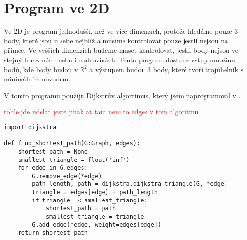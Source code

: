 \section{Program ve 2D}
\label{sec:program_2D}

Ve 2D je program jednodušší, než ve více dimenzích, protože hledáme pouze 3 body, které jsou u sebe nejblíž a musíme kontrolovat pouze jestli nejsou na přímce. Ve vyšších dimenzích budeme muset kontrolovat, jestli body nejsou ve stejných rovinách nebo i nadrovinách. Tento program dostane vstup množinu bodů, kde body budou v $\mathbb{R}^2$ a výstupem budou 3 body, které tvoří trojúhelník s minimálním obvodem. 

V tomto programu použiju Dijkstrův algortimus, který jsem naprogramoval v . 

\textcolor{red}{tohle jde udelat jeste jinak at tam neni to edges v tom algoritmu}
\begin{lstlisting}[style=metoo]
import dijkstra

def find_shortest_path(G:Graph, edges):
    shortest_path = None
    smallest_triangle = float('inf')
    for edge in G.edges:
        G.remove_edge(*edge)
        path_length, path = dijkstra.dijkstra_triangle(G, *edge)
        triangle = edges[edge] + path_length
        if triangle  < smallest_triangle:
            shortest_path = path
            smallest_triangle = triangle
        G.add_edge(*edge, weight=edges[edge])
    return shortest_path
\end{lstlisting}
